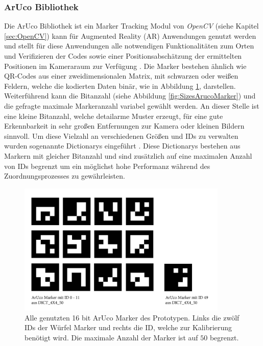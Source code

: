 \subsubsection{ArUco Bibliothek} \label{sec:aruco} 
Die ArUco Bibliothek ist ein Marker Tracking Modul von \textit{OpenCV} (siehe Kapitel \ref{sec:OpenCV}) kann für Augmented Reality (AR) Anwendungen genutzt werden und stellt für diese Anwendungen alle notwendigen Funktionalitäten zum Orten und Verifizieren der Codes sowie einer Positionsabschätzung der ermittelten Positionen im Kameraraum zur Verfügung \cite{article:Aruco2014}. 
Die Marker bestehen ähnlich wie QR-Codes aus einer zweidimensionalen Matrix, mit schwarzen oder weißen Feldern, welche die kodierten Daten binär, wie in Abbildung \ref{fig:AllUsedArucoMarker}, darstellen.  Weiterführend kann die Bitanzahl (siehe Abbildung \ref{fig:SizesArucoMarker}) und die gefragte maximale Markeranzahl variabel gewählt werden. An dieser Stelle ist eine kleine  Bitanzahl, welche detailarme Muster erzeugt, für eine gute Erkennbarkeit in sehr großen Entfernungen zur Kamera oder kleinen Bildern sinnvoll. Um diese Vielzahl an verschiedenen Größen und IDs zu verwalten wurden sogenannte Dictionarys eingeführt \cite{article:ArucoDictGarridoJurado2015}. Diese Dictionarys bestehen aus Markern mit gleicher Bitanzahl und sind zusätzlich auf eine maximalen Anzahl von IDs begrenzt um ein möglichst hohe Performanz während des Zuordnungsprozesses zu gewährleisten.\\

\begin{figure}[H] 
	\center 
	\includegraphics[width=10cm]{Bilder/Aruco_marker.jpg}			
	\caption{Alle genutzten 16 bit ArUco Marker des Prototypen. Links die zwölf IDs der Würfel Marker und rechts die ID, welche zur Kalibrierung benötigt wird. Die maximale Anzahl der Marker ist auf $50$ begrenzt.}
	\label{fig:AllUsedArucoMarker}
\end{figure}

